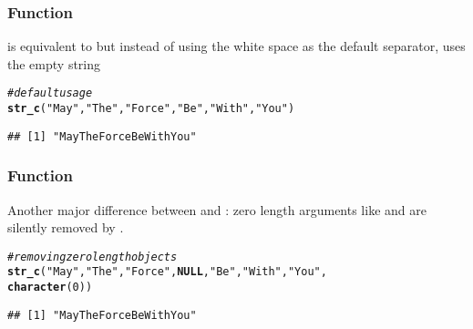 \documentclass[12pt]{beamer}\usepackage[]{graphicx}\usepackage[]{color}
\makeatletter
\newcommand{\hlnum}[1]{\textcolor[rgb]{0.686,0.059,0.569}{#1}}%
\newcommand{\hlstr}[1]{\textcolor[rgb]{0.192,0.494,0.8}{#1}}%
\newcommand{\hlcom}[1]{\textcolor[rgb]{0.678,0.584,0.686}{\textit{#1}}}%
\newcommand{\hlstd}[1]{\textcolor[rgb]{0.345,0.345,0.345}{#1}}%
\newcommand{\hlkwa}[1]{\textcolor[rgb]{0.161,0.373,0.58}{\textbf{#1}}}%
\newcommand{\hlkwd}[1]{\textcolor[rgb]{0.737,0.353,0.396}{\textbf{#1}}}%
\newenvironment{kframe}{%
 \def\at@end@of@kframe{}%
 \ifinner\ifhmode%
  \def\at@end@of@kframe{\end{minipage}}%
  \begin{minipage}{\columnwidth}%
 \fi\fi%
 \def\FrameCommand##1{\hskip\@totalleftmargin \hskip-\fboxsep
 \colorbox{shadecolor}{##1}\hskip-\fboxsep
     \hskip-\linewidth \hskip-\@totalleftmargin \hskip\columnwidth}%
 \MakeFramed {\advance\hsize-\width
   \@totalleftmargin\z@ \linewidth\hsize
   \@setminipage}}%
 {\par\unskip\endMakeFramed%
 \at@end@of@kframe}
\newenvironment{knitrout}{}{} %
\makeatother
\begin{document}
\begin{frame}[fragile]
\frametitle{Function }

 is equivalent to  but instead of using the white space as the default separator,  uses the empty string 
\begin{knitrout}\footnotesize
{}\color{fgcolor}\begin{kframe}
\begin{alltt}
\hlcom{# default usage}
\hlkwd{str_c}\hlstd{(}\hlstr{"May"}\hlstd{,} \hlstr{"The"}\hlstd{,} \hlstr{"Force"}\hlstd{,} \hlstr{"Be"}\hlstd{,} \hlstr{"With"}\hlstd{,} \hlstr{"You"}\hlstd{)}
\end{alltt}
\begin{verbatim}
## [1] "MayTheForceBeWithYou"
\end{verbatim}
\end{kframe}
\end{knitrout}

\end{frame}


\begin{frame}[fragile]
\frametitle{Function }

Another major difference between  and : zero length arguments like  and  are silently removed by .

\begin{knitrout}\footnotesize
{}\color{fgcolor}\begin{kframe}
\begin{alltt}
\hlcom{# removing zero length objects}
\hlkwd{str_c}\hlstd{(}\hlstr{"May"}\hlstd{,} \hlstr{"The"}\hlstd{,} \hlstr{"Force"}\hlstd{,} \hlkwa{NULL}\hlstd{,} \hlstr{"Be"}\hlstd{,} \hlstr{"With"}\hlstd{,} \hlstr{"You"}\hlstd{,}
      \hlkwd{character}\hlstd{(}\hlnum{0}\hlstd{))}
\end{alltt}
\begin{verbatim}
## [1] "MayTheForceBeWithYou"
\end{verbatim}
\end{kframe}
\end{knitrout}

\end{frame}

\end{document}
